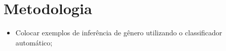 \chapter{Metodologia}

\begin{itemize}
\item Colocar exemplos de inferência de gênero utilizando o classificador automático;
\end{itemize}
